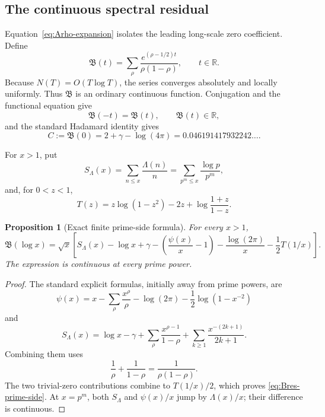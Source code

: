 \documentclass[11pt,a4paper]{article}
\numberwithin{equation}{section}
\newtheorem{proposition}[theorem]{Proposition}
\theoremstyle{definition}
\newcommand{\Bres}{\mathfrak B}
\begin{document}
\subsection{The continuous spectral residual}

Equation~\eqref{eq:Arho-expansion} isolates the leading long-scale zero
coefficient.  Define
\begin{equation}\label{eq:Bres-def}
  \boxed{
  \Bres(t)
  =\sum_\rho
  \frac{e^{(\rho-1/2)t}}{\rho(1-\rho)},
  \qquad t\in\mathbb R.
  }
\end{equation}
Because \(N(T)=O(T\log T)\), the series converges absolutely and locally
uniformly.  Thus \(\Bres\) is an ordinary continuous function.  Conjugation
and the functional equation give
\[
  \Bres(-t)=\Bres(t),
  \qquad
  \Bres(t)\in\mathbb R,
\]
and the standard Hadamard identity gives
\begin{equation}\label{eq:Bres-origin}
  C:=\Bres(0)=2+\gamma-\log(4\pi)
  =0.046191417932242\ldots.
\end{equation}

For \(x>1\), put
\[
  S_\Lambda(x)=\sum_{n\le x}\frac{\Lambda(n)}n
  =\sum_{p^m\le x}\frac{\log p}{p^m},
\]
and, for \(0<z<1\),
\[
  T(z)=z\log(1-z^2)-2z+\log\frac{1+z}{1-z}.
\]

\begin{proposition}[Exact finite prime-side formula]
\label{prop:Bres-prime-side}
For every \(x>1\),
\begin{equation}\label{eq:Bres-prime-side}
  \boxed{
  \Bres(\log x)
  =\sqrt{x}\left[
  S_\Lambda(x)-\log x+\gamma
  -\left(\frac{\psi(x)}x-1\right)
  -\frac{\log(2\pi)}x
  -\frac12T(1/x)
  \right].
  }
\end{equation}
The expression is continuous at every prime power.
\end{proposition}

\begin{proof}
The standard explicit formulas, initially away from prime powers, are
\[
  \psi(x)=x-\sum_\rho\frac{x^\rho}{\rho}
  -\log(2\pi)-\frac12\log(1-x^{-2})
\]
and
\[
  S_\Lambda(x)=\log x-\gamma
  +\sum_\rho\frac{x^{\rho-1}}{1-\rho}
  +\sum_{k\ge1}\frac{x^{-(2k+1)}}{2k+1}.
\]
Combining them uses
\[
  \frac1\rho+\frac1{1-\rho}=\frac1{\rho(1-\rho)}.
\]
The two trivial-zero contributions combine to \(T(1/x)/2\), which proves
\eqref{eq:Bres-prime-side}.  At \(x=p^m\), both \(S_\Lambda\) and
\(\psi(x)/x\) jump by \(\Lambda(x)/x\); their difference is continuous.
\end{proof}
\end{document}
